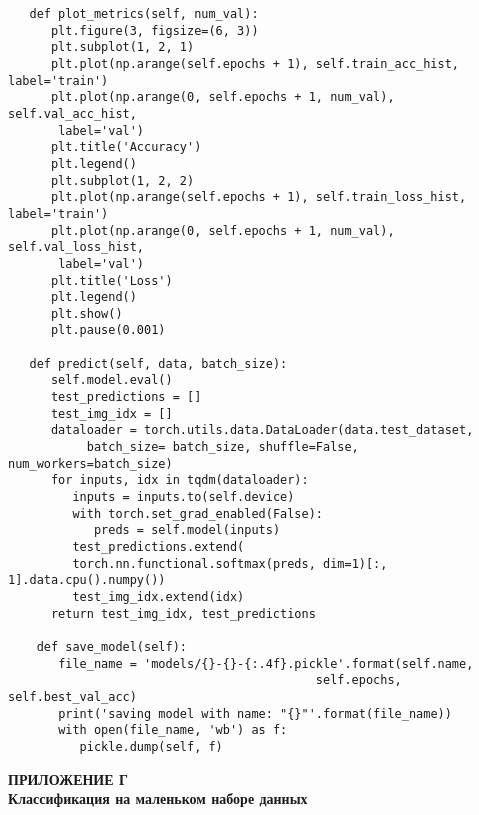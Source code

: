 \begin{verbatim}
   def plot_metrics(self, num_val):
      plt.figure(3, figsize=(6, 3))
      plt.subplot(1, 2, 1)
      plt.plot(np.arange(self.epochs + 1), self.train_acc_hist, label='train')
      plt.plot(np.arange(0, self.epochs + 1, num_val), self.val_acc_hist,
       label='val')
      plt.title('Accuracy')
      plt.legend()
      plt.subplot(1, 2, 2)
      plt.plot(np.arange(self.epochs + 1), self.train_loss_hist, label='train')
      plt.plot(np.arange(0, self.epochs + 1, num_val), self.val_loss_hist,
       label='val')
      plt.title('Loss')
      plt.legend()
      plt.show()
      plt.pause(0.001)

   def predict(self, data, batch_size):
      self.model.eval()
      test_predictions = []
      test_img_idx = []
      dataloader = torch.utils.data.DataLoader(data.test_dataset, 
           batch_size= batch_size, shuffle=False, num_workers=batch_size)
      for inputs, idx in tqdm(dataloader):
         inputs = inputs.to(self.device)
         with torch.set_grad_enabled(False):
            preds = self.model(inputs)
         test_predictions.extend(
         torch.nn.functional.softmax(preds, dim=1)[:, 1].data.cpu().numpy())
         test_img_idx.extend(idx)
      return test_img_idx, test_predictions

    def save_model(self):
       file_name = 'models/{}-{}-{:.4f}.pickle'.format(self.name,
                                           self.epochs, self.best_val_acc)
       print('saving model with name: "{}"'.format(file_name))
       with open(file_name, 'wb') as f:
          pickle.dump(self, f)
\end{verbatim}
\newpage\normalsize
\begin{center}
	\textbf{ПРИЛОЖЕНИЕ Г\\ Классификация на маленьком наборе данных}
\end{center}
\small
